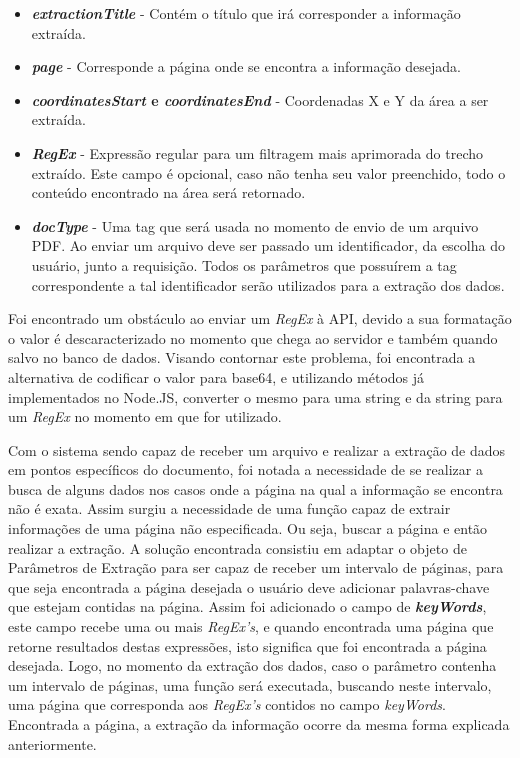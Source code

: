 \begin{itemize}
    \item \textbf{\textit{extractionTitle}} - Contém o título que irá corresponder a informação extraída. 
    
    \item \textbf{\textit{page}} - Corresponde a página onde se encontra a informação desejada.
    
    \item \textbf{\textit{coordinatesStart} e \textit{coordinatesEnd}} - Coordenadas X e Y da área a ser extraída.
    
    \item \textbf{\textit{RegEx}} - Expressão regular para um filtragem mais aprimorada do trecho extraído. Este campo é opcional, caso não tenha seu valor preenchido, todo o conteúdo encontrado na área será retornado.
    
    \item \textbf{\textit{docType}} - Uma tag que será usada no momento de envio de um arquivo PDF. Ao enviar um arquivo deve ser passado um identificador, da escolha do usuário, junto a requisição. Todos os parâmetros que possuírem a tag correspondente a tal identificador serão utilizados para a extração dos dados.
\end{itemize}

Foi encontrado um obstáculo ao enviar um \textit{RegEx} à API, devido a sua formatação o valor é descaracterizado no momento que chega ao servidor e também quando salvo no banco de dados. Visando contornar este problema, foi encontrada a alternativa de codificar o valor para base64, e utilizando métodos já implementados no Node.JS, converter o mesmo para uma string e da string para um \textit{RegEx} no momento em que for utilizado.

Com o sistema sendo capaz de receber um arquivo e realizar a extração de dados em pontos específicos do documento, foi notada a necessidade de se realizar a busca de alguns dados nos casos onde a página na qual a informação se encontra não é exata. 
Assim surgiu a necessidade de uma função capaz de extrair informações de uma página não especificada. Ou seja, buscar a página e então realizar a extração. A solução encontrada consistiu em adaptar o objeto de Parâmetros de Extração para ser capaz de receber um intervalo de páginas, para que seja encontrada a página desejada o usuário deve adicionar palavras-chave que estejam contidas na página. Assim foi adicionado o campo de \textbf{\textit{keyWords}}, este campo recebe uma ou mais \textit{RegEx's}, e quando encontrada uma página que retorne resultados destas expressões, isto significa que foi encontrada a página desejada. Logo, no momento da extração dos dados, caso o parâmetro contenha um intervalo de páginas, uma função será executada, buscando neste intervalo, uma página que corresponda aos \textit{RegEx's} contidos no campo 
\textit{keyWords}. Encontrada a página, a extração da informação ocorre da mesma forma explicada anteriormente.

